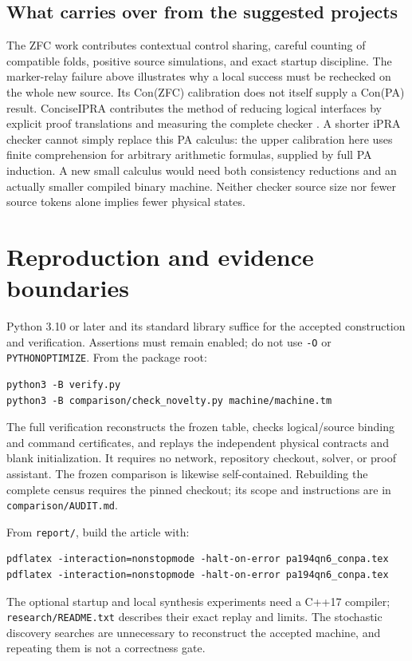 \documentclass[11pt,letterpaper]{article}
\newcommand{\file}[1]{\texttt{\nolinkurl{#1}}}
\begin{document}
\subsection{What carries over from the suggested projects}

The ZFC work contributes contextual control sharing, careful counting of
compatible folds, positive source simulations, and exact startup discipline.
The marker-relay failure above illustrates why a local success must be
rechecked on the whole new source. Its Con(ZFC) calibration does not itself
supply a Con(PA) result. ConciseIPRA contributes the method of reducing
logical interfaces by explicit proof translations and measuring the complete
checker \cite{ipra}. A shorter iPRA checker cannot simply replace this PA
calculus: the upper calibration here uses finite comprehension for arbitrary
arithmetic formulas, supplied by full PA induction. A new small calculus
would need both consistency reductions and an actually smaller compiled
binary machine. Neither checker source size nor fewer source tokens alone
implies fewer physical states.

\section{Reproduction and evidence boundaries}
\label{sec:reproduce}

Python 3.10 or later and its standard library suffice for the accepted
construction and verification. Assertions must remain enabled; do not use
\texttt{-O} or \texttt{PYTHONOPTIMIZE}. From the package root:
\begin{verbatim}
python3 -B verify.py
python3 -B comparison/check_novelty.py machine/machine.tm
\end{verbatim}
The full verification reconstructs the frozen table, checks logical/source
binding and command certificates, and replays the independent physical
contracts and blank initialization. It requires no network, repository
checkout, solver, or proof assistant. The frozen comparison is likewise
self-contained. Rebuilding the complete census requires the pinned checkout;
its scope and instructions are in \file{comparison/AUDIT.md}.

From \file{report/}, build the article with:
\begin{verbatim}
pdflatex -interaction=nonstopmode -halt-on-error pa194qn6_conpa.tex
pdflatex -interaction=nonstopmode -halt-on-error pa194qn6_conpa.tex
\end{verbatim}
The optional startup and local synthesis experiments need a C++17 compiler;
\file{research/README.txt} describes their exact replay and limits. The
stochastic discovery searches are unnecessary to reconstruct the accepted
machine, and repeating them is not a correctness gate.
\end{document}
